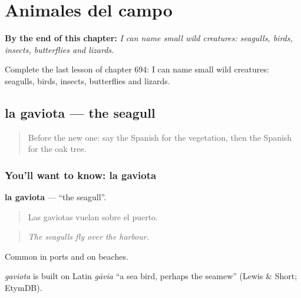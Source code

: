 
\chapter{Animales del campo}
\label{ch:es-animales-del-campo}

\begin{chapteropening}
\textbf{By the end of this chapter:} \emph{I can name small wild creatures: seagulls, birds, insects, butterflies and lizards.}

Complete the last lesson of chapter 694: I can name small wild creatures: seagulls, birds, insects, butterflies and lizards.
\end{chapteropening}

\section[la gaviota]{la gaviota — the seagull}

\label{lesson:ES-C694-gaviota}



\begin{quote}
Before the new one: say the Spanish for the vegetation, then the Spanish for the oak tree.
\end{quote}

\subsection*{You'll want to know: la gaviota}
\textbf{la gaviota} — \textquotedblleft{}the seagull\textquotedblright{}.

\begin{quote}
Las gaviotas vuelan sobre el puerto.
\end{quote}

\begin{quote}
\emph{The seagulls fly over the harbour.}
\end{quote}

Common in ports and on beaches.

\begin{cousinweb}
\emph{gaviota} is built on Latin \emph{gāvia} \textquotedblleft{}a sea bird, perhaps the seamew\textquotedblright{} (Lewis \& Short; EtymDB).
\end{cousinweb}

